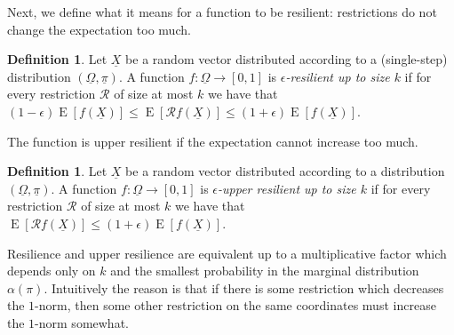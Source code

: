 \documentclass{daj}
\newcommand{\1}{\mathbbm{1}}
\theoremstyle{plain}
\theoremstyle{definition}
\newtheorem{definition}[theorem]{Definition}
\DeclareMathOperator*{\EE}{E}
\newcommand{\cR}{\mathcal{R}}
\begin{document}
Next, we define what it means for a function to be resilient:
restrictions do not change the expectation too much.
\begin{definition}
Let $\underline{X}$ be a random vector distributed according
to a (single-step) distribution $(\underline{\Omega}, \underline{\pi})$.
A function $f: \underline{\Omega} \to [0,1]$ is \emph{$\epsilon$-resilient up to
size $k$} if for every restriction $\cR$ of size at most $k$ we have that
$(1-\epsilon)\EE[f(\underline{X})] \leq \EE[\cR f(\underline{X})] 
\leq (1+\epsilon)\EE[f(\underline{X})]$.
\end{definition}

The function is upper resilient if the expectation cannot increase too much.
\begin{definition}
Let $\underline{X}$ be a random vector distributed according
to a distribution $(\underline{\Omega}, \underline{\pi})$.
A function $f: \underline{\Omega} \to [0,1]$ is \emph{$\epsilon$-upper resilient
up to size $k$} if for every 
restriction $\cR$ of size at most $k$ we have that
$\EE[\cR f(\underline{X})] \leq (1+\epsilon) \EE[f(\underline{X})]$.
\end{definition}

Resilience and upper resilience are equivalent up to a multiplicative
factor which depends only on $k$ and the smallest probability in the
marginal distribution  $\alpha(\pi)$.
Intuitively the reason is that if there is some restriction which
decreases the $1$-norm, then some other restriction on the same
coordinates must increase the $1$-norm somewhat.
\end{document}
